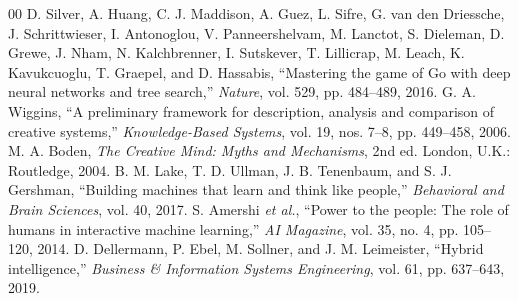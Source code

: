 \documentclass[conference]{IEEEtran}
\begin{document}
\begin{thebibliography}{00}
 D. Silver, A. Huang, C. J. Maddison, A. Guez, L. Sifre, G. van den Driessche, J. Schrittwieser, I. Antonoglou, V. Panneershelvam, M. Lanctot, S. Dieleman, D. Grewe, J. Nham, N. Kalchbrenner, I. Sutskever, T. Lillicrap, M. Leach, K. Kavukcuoglu, T. Graepel, and D. Hassabis, ``Mastering the game of Go with deep neural networks and tree search,'' \emph{Nature}, vol. 529, pp. 484--489, 2016.
 G. A. Wiggins, ``A preliminary framework for description, analysis and comparison of creative systems,'' \emph{Knowledge-Based Systems}, vol. 19, nos. 7--8, pp. 449--458, 2006.
 M. A. Boden, \emph{The Creative Mind: Myths and Mechanisms}, 2nd ed. London, U.K.: Routledge, 2004.
 B. M. Lake, T. D. Ullman, J. B. Tenenbaum, and S. J. Gershman, ``Building machines that learn and think like people,'' \emph{Behavioral and Brain Sciences}, vol. 40, 2017.
 S. Amershi \emph{et al.}, ``Power to the people: The role of humans in interactive machine learning,'' \emph{AI Magazine}, vol. 35, no. 4, pp. 105--120, 2014.
 D. Dellermann, P. Ebel, M. Sollner, and J. M. Leimeister, ``Hybrid intelligence,'' \emph{Business \& Information Systems Engineering}, vol. 61, pp. 637--643, 2019.
\end{thebibliography}
\end{document}
